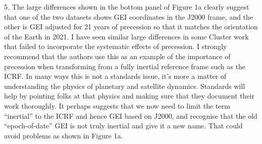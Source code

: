 \documentclass[11pt]{article}
\begin{document}
5. The large differences shown in the bottom panel of Figure 1a clearly suggest that one of the two datasets shows GEI coordinates in the J2000 frame, and the other is GEI adjusted for 21 years of precession so that it matches the orientation of the Earth in 2021. I have seen similar large differences in some Cluster work that failed to incorporate the systematic effects of precession. I strongly recommend that the authors use this as an example of the importance of precession when transforming from a fully inertial reference frame such as the ICRF. In many ways this is not a standards issue, it’s more a matter of understanding the physics of planetary and satellite dynamics. Standards will help by pointing folks at that physics and making sure that they document their work thoroughly. It perhaps suggests that we now need to limit the term “inertial” to the ICRF and hence GEI based on J2000, and recognise that the old “epoch-of-date” GEI is not truly inertial and give it a new name. That could avoid problems as shown in Figure 1a.
\\
\end{document}
